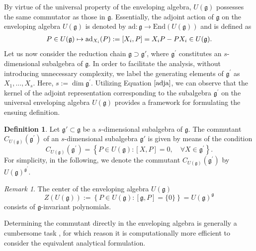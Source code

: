 \documentclass[10pt]{amsart}
\theoremstyle{definition}
\newtheorem{definition}[theorem]{Definition}
\theoremstyle{corollary}
\theoremstyle{remark}
\newtheorem{remark}[theorem]{Remark}
\theoremstyle{conclusion}
\begin{document}
\medskip
\noindent By virtue of the universal property of the enveloping algebra, $U(\mathfrak{g})$ possesses the same commutator as those in $\mathfrak{g}$. Essentially, the adjoint action of $\mathfrak{g}$ on the enveloping algebra $U(\mathfrak{g})$ is denoted by $\mathrm{ad}:\mathfrak{g} \rightarrow \mathrm{End}\left(U(\mathfrak{g})\right)$ and is defined as 
\begin{equation}\label{adja}
	\begin{array}[c]{rl}
		P\in U(\mathfrak{g}) \mapsto  \mathrm{ad}_{X_i}(P):= \left[X_i,P\right]= X_i P-P X_i\in U(\mathfrak{g})  .%
	\end{array}
\end{equation} Let us now consider the reduction chain $\mathfrak{g} \supset \mathfrak{g}'$, where $\mathfrak{g}^\prime$ constitutes an $s$-dimensional subalgebra of $\mathfrak{g}$. In order to facilitate the analysis, without introducing unnecessary complexity, we label the generating elements of $\mathfrak{g}^\prime$ as $X_1,\ldots,X_s$. Here, $s :=\dim \mathfrak{g}^\prime$. Utilizing Equation $\eqref{adja}$, we can observe that the kernel of the adjoint representation corresponding to the subalgebra $\mathfrak{g}^\prime$ on the universal enveloping algebra $U(\mathfrak{g})$ provides a framework for formulating the ensuing definition. 

\medskip
\begin{definition}
     Let $\mathfrak{g}' \subset \mathfrak{g}$ be a $s$-dimensional subalgebra of $\mathfrak{g}.$ The commutant $C_{U(\mathfrak{g})}(\mathfrak{g}^{\prime})$ of an $s$-dimensional subalgebra $\mathfrak{g}'$ is given by means of the condition  
\begin{equation}
	C_{U(\mathfrak{g})}(\mathfrak{g}^{\prime})=\left\{ P\in U(\mathfrak{g}): [X,P]=0,\quad \forall X\in\mathfrak{g}^{\prime}\right\} .\label{comm}
\end{equation} For simplicity, in the following, we denote the commutant $C_{U(\mathfrak{g})}(\mathfrak{g}^{\prime})$ by $U(\mathfrak{g})^{\mathfrak{g}^{\prime}}.$
\end{definition}

\begin{remark}
   The center of the enveloping algebra $U(\mathfrak{g})$
\begin{equation}\label{INVS1}
	Z\left(U(\mathfrak{g})\right) := \left\{ P\in U(\mathfrak{g}) :\left[\mathfrak{g},P\right]=\{0\}\right\}= U(\mathfrak{g})^\mathfrak{g}
\end{equation} consists of $\mathfrak{g}$-invariant polynomials.
\end{remark}
\noindent Determining the commutant directly in the enveloping algebra is generally a cumbersome task \cite{CampoamorStursberg2021,campoamor2022some}, for which reason it is computationally more efficient to consider the equivalent analytical formulation. 
\end{document}
